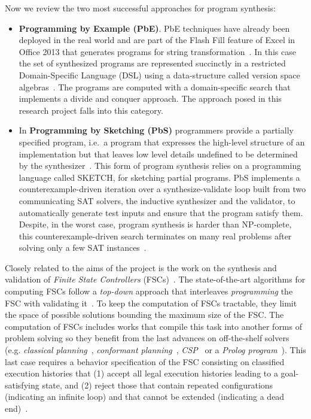 \documentclass[10pt,a4paper]{paper}
\begin{document}
Now we review the two most successful approaches for program synthesis:
\begin{itemize}
\item{\bf Programming by Example (PbE)}. PbE techniques have already been deployed in the real world and are part of the {\sc Flash Fill} feature of Excel in Office 2013 that generates programs for string transformation~\cite{gulwani2011automating}. In this case the set of synthesized programs are represented succinctly in a restricted Domain-Specific Language (DSL) using a data-structure called version space algebras~\cite{mitchell1982generalization}. The programs are computed with a domain-specific search that implements a divide and conquer approach. The approach posed in this research project falls into this category.

\item In {\bf Programming by Sketching (PbS)} programmers provide a partially specified program, i.e.~a program that expresses the high-level structure of an implementation but that leaves low level details undefined to be determined by the synthesizer~\cite{solar2006combinatorial}. This form of program synthesis relies on a programming language called {\sc SKETCH}, for sketching partial programs. PbS implements a counterexample-driven iteration over a synthesize-validate loop built from two communicating SAT solvers, the inductive synthesizer and the validator, to automatically generate test inputs and ensure that the program satisfy them. Despite, in the worst case, program synthesis is harder than NP-complete, this counterexample-driven search terminates on many real problems after solving only a few SAT instances~\cite{lake2015human}.
\end{itemize}

Closely related to the aims of the project is the work on the synthesis and validation of {\it Finite State Controllers} (FSCs)~\cite{geffner:policies:IJCAI15}. The state-of-the-art algorithms for computing FSCs follow a {\it top-down} approach that interleaves {\it programming} the FSC with validating it~\cite{sergio:aprograming:ijcai16}. To keep the computation of FSCs tractable, they limit the space of possible solutions bounding the maximum size of the FSC. The computation of FSCs includes works that compile this task into another forms of problem solving so they benefit from the last advances on off-the-shelf solvers (e.g. {\em classical planning}~\cite{sergio:aprograming:icaps16}, {\em conformant planning}~\cite{Geffner:FSM:AAAI10}, {\em CSP}~\cite{Infantes:FSC:ECAI2010} or a {\em Prolog program}~\cite{Giacomo:FSM:ICAPS13}). This last case requires a behavior specification of the FSC consisting on classified execution histories that (1) accept all legal execution histories leading to a goal-satisfying state, and (2) reject those that contain repeated configurations (indicating an infinite loop) and that cannot be extended (indicating a dead end)~\cite{Giacomo:FSM:ICAPS13}.
\end{document}
